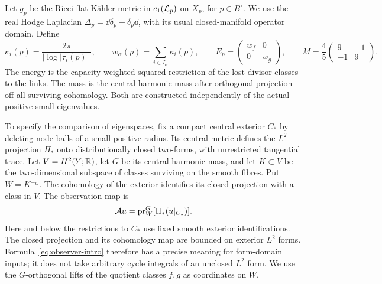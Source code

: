 Let $g_p$ be the Ricci-flat K\"ahler metric in $c_1(\mathcal L_p)$ on
$X_p$, for $p\in B^\circ$. We use the real Hodge Laplacian
$\Delta_p=\dd\delta_p+\delta_p\dd$, with its usual closed-manifold
operator domain. Define
\begin{equation}\label{eq:finite-pair-intro}
 \kappa_i(p)=\frac{2\pi}{|\log|\tau_i(p)||},\qquad
 w_\alpha(p)=\sum_{i\in I_\alpha}\kappa_i(p),\qquad
 E_p=\begin{pmatrix}w_f&0\\0&w_g\end{pmatrix},\qquad
 M=\frac45\begin{pmatrix}9&-1\\-1&9\end{pmatrix}.
\end{equation}
The energy is the capacity-weighted squared restriction of the lost
divisor classes to the links. The mass is the central harmonic mass
after orthogonal projection off all surviving cohomology. Both are
constructed independently of the actual positive small eigenvalues.

To specify the comparison of eigenspaces, fix a compact central exterior
$C_*$ by deleting node balls of a small positive radius. Its central
metric defines the $L^2$ projection $\Pi_*$ onto distributionally closed
two-forms, with unrestricted tangential trace. Let $V=H^2(Y;\mathbb R)$,
let $G$ be its central harmonic mass, and let $K\subset V$ be the
two-dimensional subspace of classes surviving on the smooth fibres.
Put $W=K^{\perp_G}$. The cohomology of the exterior identifies its
closed projection with a class in $V$. The observation map is
\begin{equation}\label{eq:observer-intro}
 \mathcal A u=\operatorname{pr}_W^G[\Pi_*(u|_{C_*})].
\end{equation}
Here and below the restrictions to $C_*$ use fixed smooth exterior
identifications. The closed projection and its cohomology map are
bounded on exterior $L^2$ forms. Formula~\eqref{eq:observer-intro}
therefore has a precise meaning for form-domain inputs; it does not
take arbitrary cycle integrals of an unclosed $L^2$ form. We use the
$G$-orthogonal lifts of the quotient classes $f,g$ as coordinates on $W$.

